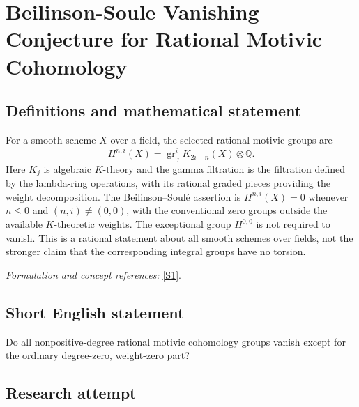 \documentclass[11pt,a4paper]{article}
\newcommand{\Q}{\mathbb{Q}}
\newcommand{\sref}[2]{\hyperlink{source:#1:#2}{[S#2]}}
\newif\ifshowcatalogue
\newcommand{\cataloguescope}[1]{\ifshowcatalogue
 \paragraph{Exact scope in the supplied catalogue.}
 \begin{quote}\small #1\end{quote}\fi}
\numberwithin{equation}{section}
\begin{document}
\setcounter{section}{185}
\clearpage
\section{\texorpdfstring{Beilinson-Soule Vanishing Conjecture for Rational Motivic Cohomology}{Beilinson-Soule Vanishing Conjecture for Rational Motivic Cohomology}}\label{186}
\subsection{Definitions and mathematical statement}
For a smooth scheme $X$ over a field, the selected rational motivic groups are
\[
 H^{n,i}(X)=\operatorname{gr}_{\gamma}^{i}K_{2i-n}(X)\otimes\Q.
\]
Here $K_j$ is algebraic $K$-theory and the gamma filtration is the filtration defined by the lambda-ring operations, with its rational graded pieces providing the weight decomposition. The Beilinson--Soul\'e assertion is
$H^{n,i}(X)=0$ whenever $n\le0$ and $(n,i)\ne(0,0)$, with the conventional zero groups outside the available $K$-theoretic weights. The exceptional group $H^{0,0}$ is not required to vanish. This is a rational statement about all smooth schemes over fields, not the stronger claim that the corresponding integral groups have no torsion.
\par\smallskip\textit{Formulation and concept references:} \sref{186}{1}.
\cataloguescope{Prove that for every smooth scheme X over a field k the rational motivic cohomology groups H\textasciicircum{}(n,i)(X), defined as the i-th graded piece for the gamma filtration on K\_(2i-n)(X) tensored with the rationals, vanish whenever n <= 0 and the pair (n,i) is not (0,0).}
\subsection{Short English statement}
Do all nonpositive-degree rational motivic cohomology groups vanish except for the ordinary degree-zero, weight-zero part?
\subsection{Research attempt}
\end{document}

